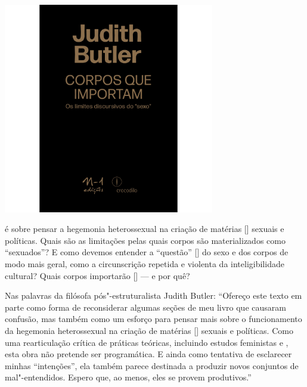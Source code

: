 \pagebreak %


\begin{center}
\hspace*{-2.5cm}
\hspace*{2.5cm}\includegraphics[width=92mm]{./grid/butler.png}
\end{center}

\hspace*{-7cm}\hrulefill\hspace*{-7cm}

\medskip

 é sobre pensar a hegemonia heterossexual na criação de matérias [{}] sexuais e políticas. Quais são as limitações pelas quais corpos são materializados como “sexuados”? E como devemos entender a “questão” [{}] do sexo e dos corpos de modo mais geral, como a circunscrição repetida e violenta da inteligibilidade cultural? Quais corpos importarão [{}] --- e por quê?

Nas palavras da filósofa pós"-estruturalista Judith Butler: “Ofereço este texto em parte como forma de reconsiderar algumas seções de meu livro {} que causaram confusão, mas também como um esforço para pensar mais sobre o funcionamento da hegemonia heterossexual na criação de matérias [{}] sexuais e políticas. Como uma rearticulação crítica de práticas teóricas, incluindo estudos feministas e {}, esta obra não pretende ser programática. E ainda como tentativa de esclarecer minhas “intenções”, ela também parece destinada a produzir novos conjuntos de mal"-entendidos. Espero que, ao menos, eles se provem produtivos.”


